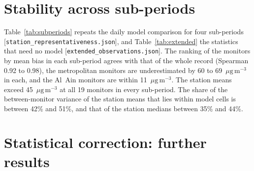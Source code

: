 \documentclass[11pt]{article}
\newcommand*{\ugm}{\ensuremath{\mu\mathrm{g\,m^{-3}}}}
\begin{document}
\section{Stability across sub-periods}

Table~\ref{tab:subperiods} repeats the daily model comparison for four sub-periods
[\texttt{station\_representativeness.json}], and Table~\ref{tab:extended} the statistics that
need no model [\texttt{extended\_observations.json}]. The ranking of the monitors by mean bias in
each sub-period agrees with that of the whole record (Spearman 0.92 to 0.98), the metropolitan
monitors are underestimated by 60 to 69~\ugm{} in each, and the Al~Ain monitors are within
11~\ugm{}. The station means exceed 45~\ugm{} at all 19 monitors in every sub-period. The share of
the between-monitor variance of the station means that lies within model cells is between 42\%
and 51\%, and that of the station medians between 35\% and 44\%.

\begin{table}[ht]\centering\small
\caption{Daily model comparison by sub-period (24-h means ending 08~UTC). Bias in \ugm{} (CAMS
minus observed): range over the 19 monitors and mean over the metropolitan and the Al~Ain
monitors. Rank agreement: Spearman correlation of the monitors' mean bias in the sub-period with
that of the whole record. Regional $\rho$: Spearman correlation of the observed and modelled
network median, days with at least ten monitors.}
\label{tab:subperiods}
\resizebox{\textwidth}{!}{}
\end{table}

\begin{table}[ht]\centering\small
\caption{Observation-only statistics by sub-period. One value per monitor and day (24-h mean
ending 08~UTC). Pair statistics use pairs with at least 30 common days.}
\label{tab:extended}
\resizebox{\textwidth}{!}{}
\end{table}

\section{Statistical correction: further results}
\end{document}
